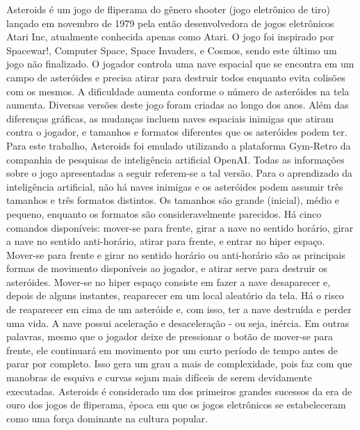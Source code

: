 Asteroids é um jogo de fliperama do gênero shooter (jogo eletrônico de tiro) lançado em novembro de 1979 pela então desenvolvedora de jogos eletrônicos Atari Inc, atualmente conhecida apenas como Atari. O jogo foi inspirado por Spacewar!, Computer Space, Space Invaders, e Cosmos, sendo este último um jogo não finalizado.
O jogador controla uma nave espacial que se encontra em um campo de asteróides e precisa atirar para destruir todos enquanto evita colisões com os mesmos. A dificuldade aumenta conforme o número de asteróides na tela aumenta.
Diversas versões deste jogo foram criadas ao longo dos anos. Além das diferenças gráficas, as mudanças incluem naves espaciais inimigas que atiram contra o jogador, e tamanhos e formatos diferentes que os asteróides podem ter.
Para este trabalho, Asteroids foi emulado utilizando a plataforma Gym-Retro da companhia de pesquisas de inteligência artificial OpenAI. Todas as informações sobre o jogo apresentadas a seguir referem-se a tal versão.
Para o aprendizado da inteligência artificial, não há naves inimigas e os asteróides podem assumir três tamanhos e três formatos distintos. Os tamanhos são grande (inicial), médio e pequeno, enquanto os formatos são consideravelmente parecidos.
Há cinco comandos disponíveis: mover-se para frente, girar a nave no sentido horário, girar a nave no sentido anti-horário, atirar para frente, e entrar no hiper espaço. Mover-se para frente e girar no sentido horário ou anti-horário são as principais formas de movimento disponíveis ao jogador, e atirar serve para destruir os asteróides. Mover-se no hiper espaço consiste em fazer a nave desaparecer e, depois de alguns instantes, reaparecer em um local aleatório da tela. Há o risco de reaparecer em cima de um asteróide e, com isso, ter a nave destruída e perder uma vida.
A nave possui aceleração e desaceleração - ou seja, inércia. Em outras palavras, mesmo que o jogador deixe de pressionar o botão de mover-se para frente, ele continuará em movimento por um curto período de tempo antes de parar por completo. Isso gera um grau a mais de complexidade, pois faz com que manobras de esquiva e curvas sejam mais difíceis de serem devidamente executadas.
Asteroids é considerado um dos primeiros grandes sucessos da era de ouro dos jogos de fliperama, época em que os jogos eletrônicos se estabeleceram como uma força dominante na cultura popular. 

